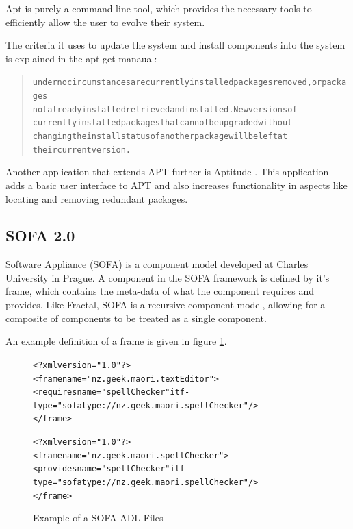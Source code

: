 Apt is purely a command line tool, which provides the necessary tools to efficiently allow the user to evolve their system.

The criteria it uses to update the system and install components into the system is explained in the apt-get manaual:

\begin{quotation}
\begin{alltt}
       under no circumstances are currently installed packages removed, or packages
       not already installed retrieved and installed. New versions of
       currently installed packages that cannot be upgraded without
       changing the install status of another package will be left at
       their current version.
 \end{alltt}
\end{quotation}

Another application that extends APT further is Aptitude \cite{Burrows2005}.
This application adds a basic user interface to APT and also increases functionality in aspects like locating and removing redundant packages. 


\subsection{SOFA 2.0}
Software Appliance (SOFA) is a component model developed at Charles University in Prague.
A component in the SOFA framework is defined by it's frame, which contains the meta-data of what the component requires and provides.
Like Fractal, SOFA is a recursive component model, allowing for a composite of components to be treated as a single component.

An example definition of a frame is given in figure \ref{SOFAmetadata}.

\begin{figure}[htp] 
\begin{center}
\begin{alltt}
<?xml version="1.0"?>
<frame name="nz.geek.maori.textEditor">
  <requires name="spellChecker" itf-type="sofatype://nz.geek.maori.spellChecker"/>
</frame>

<?xml version="1.0"?>
<frame name="nz.geek.maori.spellChecker">
  <provides name="spellChecker" itf-type="sofatype://nz.geek.maori.spellChecker"/>
</frame>
\end{alltt}
  \caption[SOFA ADL files]{Example of a SOFA ADL Files}
  \label{SOFAmetadata}
\end{center}
\end{figure}

